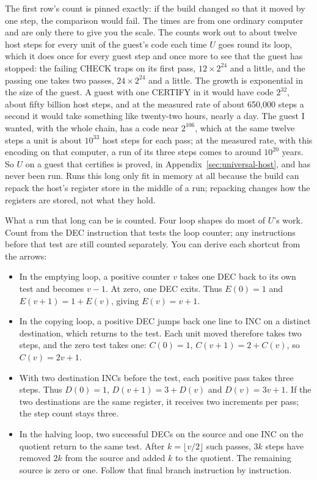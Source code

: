 \documentclass[11pt,twoside]{article}
\theoremstyle{thielethm}
\theoremstyle{thieledef}
\theoremstyle{thieledef}
\theoremstyle{thieledef}
\theoremstyle{thielethm}
\theoremstyle{thieleobs}
\theoremstyle{thielethm}
\begin{document}
The first row's count is pinned exactly: if the build changed so that it moved by one step, the
comparison would fail. The times are from one ordinary computer and are only there to give you the
scale. The counts work out to about twelve host steps for every unit of the guest's code each time $U$ goes round
its loop, which it does once for every guest step and once more to see that the guest has
stopped: the failing CHECK traps on its first pass, $12 \times 2^{24}$ and a little, and the
passing one takes two passes, $24 \times 2^{24}$ and a little. The growth is exponential in the size of
the guest. A guest with one CERTIFY in it would have code $2^{32}$, about fifty billion host
steps, and at the measured rate of about 650,000 steps a second it would take something like
twenty-two hours, nearly a day. The guest I wanted, with the whole chain, has a code near
$2^{106}$, which at the same twelve steps a unit is about $10^{33}$ host steps for each pass; at the
measured rate, with this encoding on that computer, a run of its three steps comes to around
$10^{20}$ years. So $U$ on a guest that certifies is proved, in Appendix~\ref{sec:universal-host},
and has never been run. Runs this long only fit in memory at all because the build can repack the
host's register store in the middle of a run; repacking changes how the registers are stored, not
what they hold.

What a run that long can be is counted. Four loop shapes do most of $U$'s work.
Count from the DEC instruction that tests the loop counter; any instructions before
that test are still counted separately. You can derive each shortcut from the arrows:
\begin{itemize}
\item In the emptying loop, a positive counter $v$ takes one DEC back to its own test
and becomes $v-1$. At zero, one DEC exits. Thus $E(0)=1$ and
$E(v+1)=1+E(v)$, giving $E(v)=v+1$.
\item In the copying loop, a positive DEC jumps back one line to INC on a distinct
destination, which returns to the test. Each unit moved therefore takes two steps,
and the zero test takes one: $C(0)=1$, $C(v+1)=2+C(v)$, so $C(v)=2v+1$.
\item With two destination INCs before the test, each positive pass takes three steps.
Thus $D(0)=1$, $D(v+1)=3+D(v)$ and $D(v)=3v+1$. If the two destinations are the same
register, it receives two increments per pass; the step count stays three.
\item In the halving loop, two successful DECs on the source and one INC on the
quotient return to the same test. After $k=\lfloor v/2\rfloor$ such passes,
$3k$ steps have removed $2k$ from the source and added $k$ to the quotient.
The remaining source is zero or one. Follow that final branch instruction by instruction.
\end{itemize}
\end{document}
